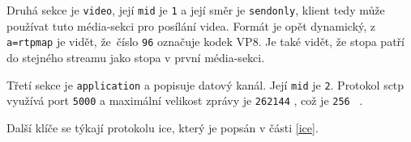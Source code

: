 Druhá sekce je \texttt{video}, její \texttt{mid} je
\texttt{1} a její směr je \texttt{sendonly}, klient tedy
může používat tuto média-sekci pro posílání videa. Formát je opět dynamický, z
\texttt{a=rtpmap} je vidět, že~číslo \texttt{96} označuje
kodek VP8. Je také vidět, že stopa patří do stejného streamu jako stopa v první
média-sekci.

Třetí sekce je \texttt{application} a popisuje datový kanál. Její
\texttt{mid} je \texttt{2}. Protokol \gls{sctp} využívá port
\texttt{5000} a maximální velikost zprávy je \texttt{262144}
\si{\byte}, což je \texttt{256} \si{\kibi\byte}.

Další klíče se týkají protokolu \gls{ice}, který je popsán v části \ref{ice}.
